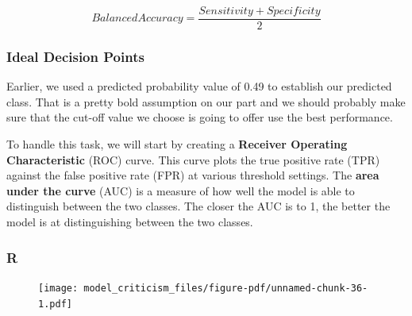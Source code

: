 \documentclass[
  letterpaper,
]{krantz}
\newenvironment{Shaded}{}{}
\newcommand{\AttributeTok}[1]{\textcolor[rgb]{0.49,0.56,0.16}{#1}}
\newcommand{\FunctionTok}[1]{\textcolor[rgb]{0.02,0.16,0.49}{#1}}
\newcommand{\NormalTok}[1]{#1}
\newcommand{\OtherTok}[1]{\textcolor[rgb]{0.00,0.44,0.13}{#1}}
\newcommand{\SpecialCharTok}[1]{\textcolor[rgb]{0.25,0.44,0.63}{#1}}
\newcommand{\StringTok}[1]{\textcolor[rgb]{0.25,0.44,0.63}{#1}}
\begin{document}
\[Balanced Accuracy = \frac{Sensitivity + Specificity}{2}\]

\subsubsection{Ideal Decision Points}\label{ideal-decision-points}

Earlier, we used a predicted probability value of 0.49 to establish our
predicted class. That is a pretty bold assumption on our part and we
should probably make sure that the cut-off value we choose is going to
offer use the best performance.

To handle this task, we will start by creating a \textbf{Receiver
Operating Characteristic} (ROC) curve. This curve plots the true
positive rate (TPR) against the false positive rate (FPR) at various
threshold settings. The \textbf{area under the curve} (AUC) is a measure
of how well the model is able to distinguish between the two classes.
The closer the AUC is to 1, the better the model is at distinguishing
between the two classes.

\subsubsection{R}

\begin{Shaded}
\end{Shaded}

\begin{figure}[H]

{\centering \texttt{[image: model\_criticism\_files/figure-pdf/unnamed-chunk-36-1.pdf]}

}

\end{figure}
\end{document}
